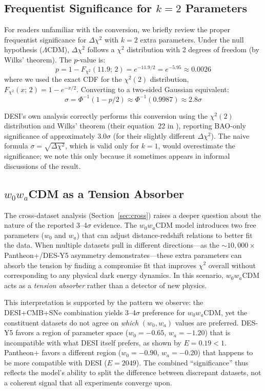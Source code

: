 \documentclass[11pt,a4paper]{article}
\newcommand{\LCDM}{$\Lambda$CDM}
\begin{document}
\subsection{Frequentist Significance for $k = 2$ Parameters}
\label{sec:sigma}

For readers unfamiliar with the conversion, we briefly review the proper frequentist significance for $\Delta\chi^2$ with $k = 2$ extra parameters. Under the null hypothesis (\LCDM), $\Delta\chi^2$ follows a $\chi^2$ distribution with 2 degrees of freedom (by Wilks' theorem). The $p$-value is:
\begin{equation}
p = 1 - F_{\chi^2}(11.9;\, 2) = e^{-11.9/2} = e^{-5.95} \approx 0.0026
\end{equation}
where we used the exact CDF for the $\chi^2(2)$ distribution, $F_{\chi^2}(x;\, 2) = 1 - e^{-x/2}$. Converting to a two-sided Gaussian equivalent:
\begin{equation}
\sigma = \Phi^{-1}(1 - p/2) \approx \Phi^{-1}(0.9987) \approx 2.8\sigma
\end{equation}

DESI's own analysis correctly performs this conversion using the $\chi^2(2)$ distribution and Wilks' theorem (their equation~22 in \citealt{DESI2025}), reporting BAO-only significance of approximately $3.0\sigma$ (for their slightly different $\Delta\chi^2$). The naive formula $\sigma = \sqrt{\Delta\chi^2}$, which is valid only for $k = 1$, would overestimate the significance; we note this only because it sometimes appears in informal discussions of the result.

\subsection{$w_0w_a$CDM as a Tension Absorber}

The cross-dataset analysis (Section~\ref{sec:cross}) raises a deeper question about the nature of the reported 3--4$\sigma$ evidence. The $w_0w_a$CDM model introduces two free parameters ($w_0$ and $w_a$) that can adjust distance-redshift relations to better fit the data. When multiple datasets pull in different directions---as the ${\sim}10{,}000\times$ Pantheon+/DES-Y5 asymmetry demonstrates---these extra parameters can absorb the tension by finding a compromise fit that improves $\chi^2$ overall without corresponding to any physical dark energy dynamics. In this scenario, $w_0w_a$CDM acts as a \textit{tension absorber} rather than a detector of new physics.

This interpretation is supported by the pattern we observe: the DESI+CMB+SNe combination yields 3--4$\sigma$ preference for $w_0w_a$CDM, yet the constituent datasets do not agree on \textit{which} $(w_0, w_a)$ values are preferred. DES-Y5 favors a region of parameter space ($w_0 = -0.65$, $w_a = -1.20$) that is incompatible with what DESI itself prefers, as shown by $E = 0.19 < 1$. Pantheon+ favors a different region ($w_0 = -0.90$, $w_a = -0.20$) that happens to be more compatible with DESI ($E = 2049$). The combined ``significance'' thus reflects the model's ability to split the difference between discrepant datasets, not a coherent signal that all experiments converge upon.
\end{document}

